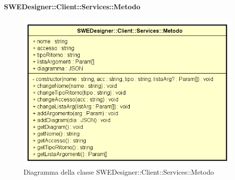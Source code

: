           	\paragraph{SWEDesigner::Client::Services::Metodo}
          	\begin{figure}[h!]
			\centering
			\includegraphics[scale=0.8]{Classi/SWEDesigner__Client__Services__Metodo.png}
			\caption{Diagramma della classe SWEDesigner::Client::Services::Metodo}
 			\end{figure}
